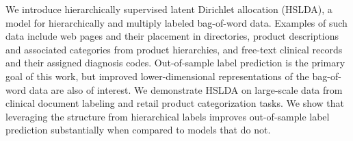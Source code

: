 We introduce hierarchically supervised latent Dirichlet allocation (HSLDA), a
model for hierarchically and multiply labeled bag-of-word data.  Examples of
such data include web pages and their placement in directories, product
descriptions and associated categories from product hierarchies, and free-text
clinical records and their assigned diagnosis codes. Out-of-sample label
prediction is the primary goal of this work, but improved lower-dimensional
representations of the bag-of-word data are also of interest.
We demonstrate HSLDA on large-scale data from clinical document labeling and
retail product categorization tasks. We show that leveraging the structure from
hierarchical labels improves out-of-sample label prediction substantially when
compared to models that do not. %


